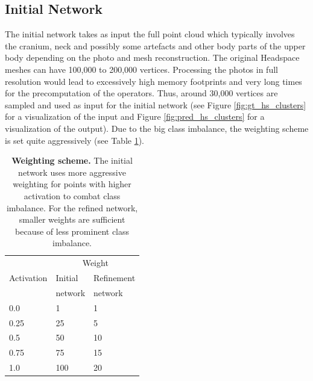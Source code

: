 \documentclass[class=article, crop=false]{standalone}
\begin{document}
\subsection{Initial Network}The initial network takes as input the full point cloud which typically involves the cranium, neck and possibly some artefacts and other body parts of the upper body depending on the photo and mesh reconstruction. The original Headspace meshes can have 100,000 to 200,000 vertices. Processing the photos in full resolution would lead to excessively high memory footprints and very long times for the precomputation of the operators. Thus, around 30,000 vertices are sampled and used as input for the initial network (see Figure \ref{fig:gt_hs_clusters} for a visualization of the input and Figure \ref{fig:pred_hs_clusters} for a visualization of the output). Due to the big class imbalance, the weighting scheme is set quite aggressively (see Table \ref{tab:weighting-scheme}).
\begin{table}[]
\centering
\begin{tabular}[t]{lll}\toprule
 & \multicolumn{2}{c}{Weight} \\
\cmidrule(lr){2-3}
Activation & Initial & Refinement\\
& network & network\\
\hline
0.0        & 1  & 1    \\
0.25       & 25 & 5    \\
0.5        & 50 & 10    \\
0.75       & 75 & 15    \\
1.0        & 100 & 20  \\ \bottomrule
\end{tabular}
\caption{\textbf{Weighting scheme.} The initial network uses more aggressive weighting for points with higher activation to combat class imbalance. For the refined network, smaller weights are sufficient because of less prominent class imbalance.}
\label{tab:weighting-scheme}
\end{table}
\end{document}
